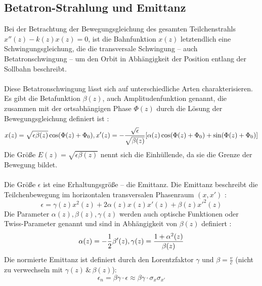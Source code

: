 \documentclass[10pt,a4paper, bibliography=totoc]{scrartcl}
\begin{document}
\subsection{Betatron-Strahlung und Emittanz}
Bei der Betrachtung der Bewegungsgleichung des gesamten Teilchenstrahls $x''(z)-k(z)x(z)=0$, ist die Bahnfunktion $x(z)$ letztendlich eine Schwingungsgleichung, die die transversale Schwingung -- auch Betatronschwingung -- um den Orbit in Abhängigkeit der Position entlang der Sollbahn beschreibt. \cite{3}\\\\
Diese Betatronschwingung lässt sich auf unterschiedliche Arten charakterisieren. Es gibt die Betafunktion $\beta(z)$, auch Amplitudenfunktion genannt, die zusammen mit der ortsabhängigen Phase $\Phi(z)$ durch die Lösung der Bewegungsgleichung definiert ist \cite{3}:
\begin{equation}
	x(z)=\sqrt{\epsilon\beta(z)}\cos(\Phi(z)+\Phi_0),\\
	x'(z)=-\frac{\sqrt{\epsilon}}{\sqrt{\beta(z)}}[\alpha(z)\cos(\Phi(z)+\Phi_0)+\sin(\Phi(z)+\Phi_0)]
\end{equation}
Die Größe $E(z)=\sqrt{\epsilon\beta(z)}$ nennt sich die Einhüllende, da sie die Grenze der Bewegung bildet.\\\\
Die Größe $\epsilon$ ist eine Erhaltungsgröße -- die Emittanz. Die Emittanz beschreibt die Teilchenbewegung im horizontalen transversalen Phasenraum $(x, x')$ \cite{3}:
\begin{equation}
	\epsilon=\gamma(z)x^2(z)+2\alpha(z)x(z)x'(z)+\beta(z)x'^2(z)
\end{equation}
Die Parameter $\alpha(z), \beta(z), \gamma(z)$ werden auch optische Funktionen oder Twiss-Parameter genannt und sind in Abhängigkeit von $\beta(z)$ definiert \cite{3}:
\begin{equation}
	\alpha(z)=-\frac{1}{2}\beta'(z),\\
	\gamma(z)=\frac{1+\alpha^2(z)}{\beta(z)}
\end{equation}
Die normierte Emittanz ist definiert durch den Lorentzfaktor $\gamma$ und $\beta=\frac{v}{c}$ (nicht zu verwechseln mit $\gamma(z)\,\&\,\beta(z)$):
\begin{equation}
	\epsilon_n=\beta\gamma\cdot\epsilon\approx\beta\gamma\cdot\sigma_x\sigma_{x'}
\end{equation}
\end{document}
